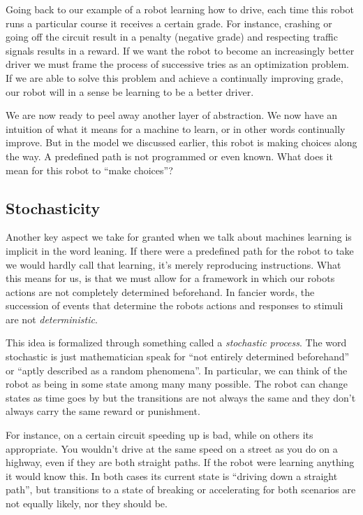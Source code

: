 Going back to our example of a robot learning how to drive, each time 
this robot runs a particular course it receives a certain grade. For 
instance, crashing or going off the circuit result in a penalty 
(negative grade) and respecting traffic signals results in a reward.  
If we want the robot to become an increasingly better driver we must 
frame the process of successive tries as an optimization problem. If 
we are able to solve this problem and achieve a continually improving 
grade, our robot will in a sense be learning to be a better driver.

We are now ready to peel away another layer of abstraction. We now 
have an intuition of what it means for a machine to learn, or in other 
words continually improve. But in the model we discussed earlier, this 
robot is making choices along the way. A predefined path is not 
programmed or even known. What does it mean for this robot to ``make 
choices''?

\subsection{Stochasticity}
Another key aspect we take for granted when we talk about machines 
learning is implicit in the word leaning. If there were a predefined 
path for the robot to take we would hardly call that learning, it's 
merely reproducing instructions. What this means for us, is that we 
must allow for a framework in which our robots actions are not 
completely determined beforehand. In fancier words, the succession of 
events that determine the robots actions and responses to stimuli are 
not \textit{deterministic}.

This idea is formalized through something called a \textit{stochastic 
process}. The word stochastic is just mathematician speak for ``not 
entirely determined beforehand'' or ``aptly described as a random 
phenomena''. In particular, we can think of the robot as being in some 
state among many many possible. The robot can change states as time 
goes by but the transitions are not always the same and they don't 
always carry the same reward or punishment.

For instance, on a certain circuit speeding up is bad, while on others 
its appropriate. You wouldn't drive at the same speed on a street as 
you do on a highway, even if they are both straight paths. If the 
robot were learning anything it would know this. In both cases its 
current state is ``driving down a straight path'', but transitions to 
a state of breaking or accelerating for both scenarios are not equally 
likely, nor they should be.

